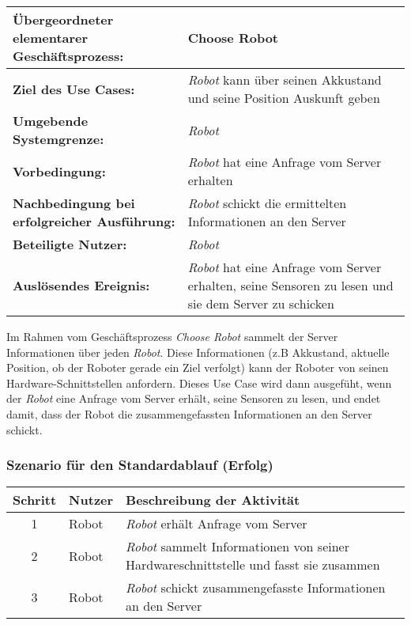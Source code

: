 \documentclass[includeheaders]{scrartcl}
\begin{document}
			\begin{table}[H]
				\centering
				\begin{tabularx}{\textwidth}{@{}p{5cm}X@{}}
				\toprule
				\textbf{Übergeordneter elementarer Geschäftsprozess:} & Choose Robot\\ \midrule
				\textbf{Ziel des Use Cases:} & \emph{Robot} kann über seinen Akkustand und seine Position Auskunft geben\\ \midrule
				\textbf{Umgebende Systemgrenze:} & \emph{Robot} \\ \midrule
				\textbf{Vorbedingung:} & \emph{Robot} hat eine Anfrage vom Server erhalten \\ \midrule
				\textbf{Nachbedingung bei erfolgreicher Ausführung:} & \emph{Robot} schickt die ermittelten Informationen an den Server \\ \midrule
				\textbf{Beteiligte Nutzer:} & \emph{Robot} \\ \midrule
				\textbf{Auslösendes Ereignis:} & \emph{Robot} hat eine Anfrage vom Server erhalten, seine Sensoren zu lesen und sie dem Server zu schicken \\ 
				\bottomrule
				\end{tabularx}
			\end{table}

			Im Rahmen vom Geschäftsprozess \emph{Choose Robot} sammelt der Server
			Informationen über jeden \emph{Robot}. Diese Informationen (z.B
			Akkustand, aktuelle Position, ob der Roboter gerade ein Ziel verfolgt)
			kann der Roboter von seinen Hardware-Schnittstellen anfordern. Dieses
			Use Case wird dann ausgefüht, wenn der \emph{Robot} eine Anfrage vom
			Server erhält, seine Sensoren zu lesen, und endet damit, dass der Robot
			die zusammengefassten Informationen an den Server schickt.
			
			\subsubsection*{Szenario für den Standardablauf (Erfolg)}

			\begin{table}[H]
				\centering
				\begin{tabularx}{\textwidth}{@{}cp{2cm}X@{}}
				\toprule
				Schritt & Nutzer & Beschreibung der Aktivität \\ \midrule
				1 & Robot & \emph{Robot} erhält Anfrage vom Server \\
				2 & Robot & \emph{Robot} sammelt Informationen von seiner Hardwareschnittstelle und fasst sie zusammen \\
				3 & Robot & \emph{Robot} schickt zusammengefasste Informationen an den Server \\
				\bottomrule
				\end{tabularx}
			\end{table}
\end{document}
